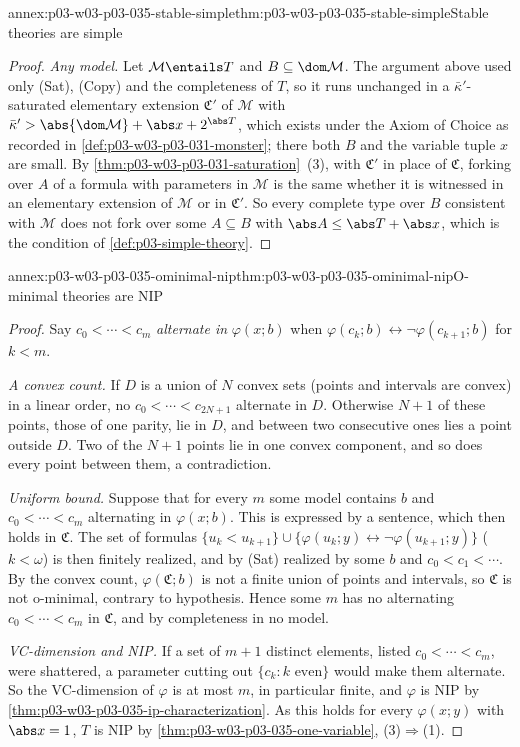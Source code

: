 \begin{annexitem}{annex:p03-w03-p03-035-stable-simple}{thm:p03-w03-p03-035-stable-simple}{Stable theories are simple}
\begin{proof}
\emph{Any model.}  Let \(\mathcal M\entails T\) and \(B\subseteq\dom\mathcal
M\).  The argument above used only (Sat), (Copy) and the completeness of
\(T\), so it runs unchanged in a \(\bar\kappa'\)-saturated elementary
extension \(\mathfrak C'\) of \(\mathcal M\) with
\(\bar\kappa'>\abs{\dom\mathcal M}+\abs x+2^{\abs T}\), which exists under
the Axiom of Choice as recorded in \cref{def:p03-w03-p03-031-monster}; there
both \(B\) and the variable tuple \(x\) are small.  By \cref{thm:p03-w03-p03-031-saturation}~(3), with \(\mathfrak C'\)
in place of \(\mathfrak C\), forking over \(A\) of a formula with parameters
in \(\mathcal M\) is the same whether it is witnessed in an elementary
extension of \(\mathcal M\) or in \(\mathfrak C'\).  So every complete type
over \(B\) consistent with \(\mathcal M\) does not fork over some
\(A\subseteq B\) with \(\abs A\leq\abs T+\abs x\), which is the condition of
\cref{def:p03-simple-theory}.
\end{proof}
\end{annexitem}

\begin{annexitem}{annex:p03-w03-p03-035-ominimal-nip}{thm:p03-w03-p03-035-ominimal-nip}{O-minimal theories are NIP}
\begin{proof}
Say \(c_0<\cdots<c_m\) \emph{alternate in} \(\varphi(x;b)\) when
\(\varphi(c_k;b)\leftrightarrow\neg\varphi(c_{k+1};b)\) for \(k<m\).

\emph{A convex count.}  If \(D\) is a union of \(N\) convex sets (points and
intervals are convex) in a linear order, no \(c_0<\cdots<c_{2N+1}\) alternate
in \(D\).  Otherwise \(N+1\) of these points, those of one parity, lie in
\(D\), and between two consecutive ones lies a point outside \(D\).  Two of the
\(N+1\) points lie in one convex component, and so does every point between
them, a contradiction.

\emph{Uniform bound.}  Suppose that for every \(m\) some model contains \(b\)
and \(c_0<\cdots<c_m\) alternating in \(\varphi(x;b)\).  This is expressed by
a sentence, which then holds in \(\mathfrak C\).  The set of formulas
\(\{u_k<u_{k+1}\}\cup\{\varphi(u_k;y)\leftrightarrow\neg\varphi(u_{k+1};y)\}\)
(\(k<\omega\)) is then finitely realized, and by (Sat) realized by some \(b\)
and \(c_0<c_1<\cdots\).  By the convex count, \(\varphi(\mathfrak C;b)\) is not
a finite union of points and intervals, so \(\mathfrak C\) is not o-minimal,
contrary to hypothesis.  Hence some \(m\) has no alternating
\(c_0<\cdots<c_m\) in \(\mathfrak C\), and by completeness in no model.

\emph{VC-dimension and NIP.}  If a set of \(m+1\) distinct elements, listed
\(c_0<\cdots<c_m\), were shattered, a parameter cutting out
\(\{c_k:k\text{ even}\}\) would make them alternate.  So the VC-dimension of
\(\varphi\) is at most \(m\), in particular finite, and \(\varphi\) is NIP by
\cref{thm:p03-w03-p03-035-ip-characterization}.  As this holds for every
\(\varphi(x;y)\) with \(\abs x=1\), \(T\) is NIP by
\cref{thm:p03-w03-p03-035-one-variable}, (3)\(\Rightarrow\)(1).
\end{proof}
\end{annexitem}

